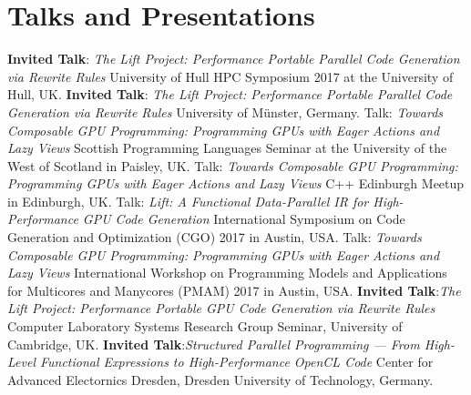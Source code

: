 \documentclass[11pt,a4paper]{moderncv}
\begin{document}
\section{Talks and Presentations}
         {\textbf{Invited Talk}:\newline
          \emph{The Lift Project: Performance Portable Parallel Code Generation via Rewrite Rules}\newline
         \small University of Hull HPC Symposium 2017 at the University of Hull, UK.}
         {\textbf{Invited Talk}:\newline
          \emph{The Lift Project: Performance Portable Parallel Code Generation via Rewrite Rules}\newline
         \small University of Münster, Germany.}
         {Talk: \emph{Towards Composable GPU Programming: Programming GPUs with Eager Actions and Lazy Views}\newline
         \small Scottish Programming Languages Seminar at the University of the West of Scotland in Paisley, UK.}
         {Talk: \emph{Towards Composable GPU Programming: Programming GPUs with Eager Actions and Lazy Views}\newline
         \small C++ Edinburgh Meetup in Edinburgh, UK.}
         {Talk: \emph{Lift: A Functional Data-Parallel IR for High-Performance GPU Code Generation}\newline
          \small International Symposium on Code Generation and Optimization (CGO) 2017 in Austin, USA.}
         {Talk: \emph{Towards Composable GPU Programming: Programming GPUs with Eager Actions and Lazy Views}\newline
          \small  International Workshop on Programming Models and Applications for Multicores and Manycores (PMAM) 2017 in Austin, USA.}
         {\textbf{Invited Talk}:\newline \emph{The Lift Project: Performance Portable GPU Code Generation via Rewrite Rules}\newline
         Computer Laboratory Systems Research Group Seminar, University of Cambridge, UK.
         }
         {\textbf{Invited Talk}:\newline \emph{Structured Parallel Programming --- From High-Level Functional Expressions to High-Performance OpenCL Code}\newline
         Center for Advanced Electornics Dresden, Dresden University of Technology, Germany.
         }
\end{document}
